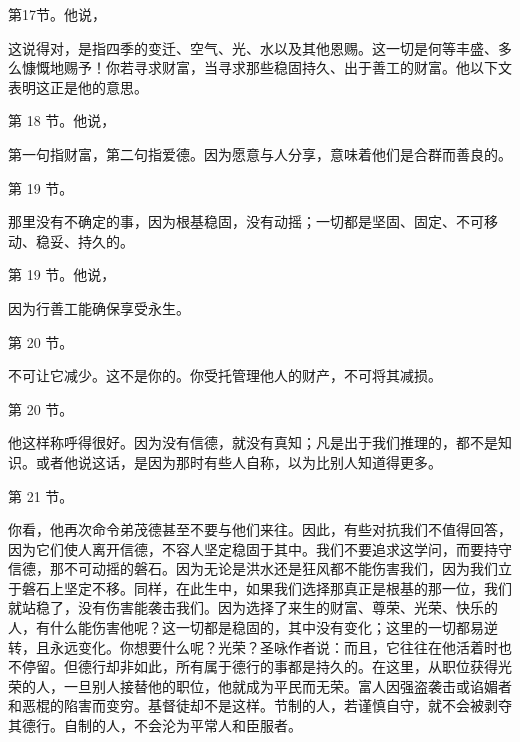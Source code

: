第17节。他说，\par

这说得对，是指四季的变迁、空气、光、水以及其他恩赐。这一切是何等丰盛、多么慷慨地赐予！你若寻求财富，当寻求那些稳固持久、出于善工的财富。他以下文表明这正是他的意思。\par

第 18 节。他说，\par

第一句指财富，第二句指爱德。因为愿意与人分享，意味着他们是合群而善良的。\par

第 19 节。\par

那里没有不确定的事，因为根基稳固，没有动摇；一切都是坚固、固定、不可移动、稳妥、持久的。\par

第 19 节。他说，\par

因为行善工能确保享受永生。\par

第 20 节。\par

不可让它减少。这不是你的。你受托管理他人的财产，不可将其减损。\par

第 20 节。\par

他这样称呼得很好。因为没有信德，就没有真知；凡是出于我们推理的，都不是知识。或者他说这话，是因为那时有些人自称，以为比别人知道得更多。\par

第 21 节。\par

你看，他再次命令弟茂德甚至不要与他们来往。因此，有些对抗我们不值得回答，因为它们使人离开信德，不容人坚定稳固于其中。我们不要追求这学问，而要持守信德，那不可动摇的磐石。因为无论是洪水还是狂风都不能伤害我们，因为我们立于磐石上坚定不移。同样，在此生中，如果我们选择那真正是根基的那一位，我们就站稳了，没有伤害能袭击我们。因为选择了来生的财富、尊荣、光荣、快乐的人，有什么能伤害他呢？这一切都是稳固的，其中没有变化；这里的一切都易逆转，且永远变化。你想要什么呢？光荣？圣咏作者说：而且，它往往在他活着时也不停留。但德行却非如此，所有属于德行的事都是持久的。在这里，从职位获得光荣的人，一旦别人接替他的职位，他就成为平民而无荣。富人因强盗袭击或谄媚者和恶棍的陷害而变穷。基督徒却不是这样。节制的人，若谨慎自守，就不会被剥夺其德行。自制的人，不会沦为平常人和臣服者。\par

